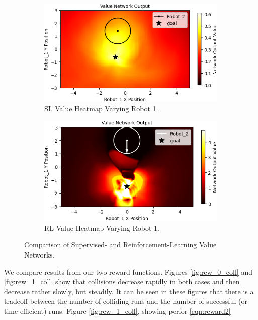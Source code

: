 \documentclass[conference]{IEEEtran}
\begin{document}
\begin{figure}[t]
    \centering
    \begin{subfigure}[b]{0.49\textwidth}
         \centering
         \includegraphics[width=\textwidth]{docs/latex/figures/heatmap_2_Robot_1.png}
         \caption{SL Value Heatmap Varying Robot 1.}
         \label{fig:heatmap_21}
     \end{subfigure}
     \hfill
     \begin{subfigure}[b]{0.49\textwidth}
         \centering
         \includegraphics[width=\textwidth]{docs/latex/figures/heatmap_rl_robot1.png}
         \caption{RL Value Heatmap Varying Robot 1.}
         \label{fig:heatmap_22}
     \end{subfigure}
     \caption{Comparison of Supervised- and Reinforcement-Learning Value Networks.}\label{fig:heatmap_2}
\end{figure}

We compare results from our two reward functions. Figures \ref{fig:rew_0_coll} and \ref{fig:rew_1_coll} show that collisions decrease rapidly in both cases and then decrease rather slowly, but steadily. It can be seen in these figures that there is a tradeoff between the number of colliding runs and the number of successful (or time-efficient) runs. Figure \ref{fig:rew_1_coll}, showing perfor  \ref{eqn:reward2}
\end{document}
